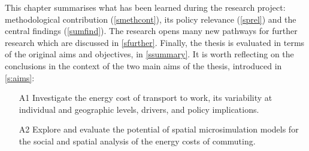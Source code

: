 \documentclass[a4paper, 11pt, twoside]{Thesis}
\begin{document}
This chapter summarises what has
been learned during the research project:
methodological  contribution (\cref{smethcont}), its policy relevance
(\cref{sprel}) and the central findings (\cref{sumfind}). The research opens many
new pathways for further research which are discussed in \cref{sfurther}.
Finally, the thesis is evaluated in terms of the original aims and objectives,
in \cref{ssummary}. It is worth reflecting on the conclusions in the
context of the two
main aims of the thesis, introduced in \cref{s:aims}:
\begin{itemize}
 \item[A1] Investigate the energy cost of transport to work, its variability
at individual and geographic levels, drivers, and policy implications.
  \item[A2] Explore and evaluate the potential of spatial microsimulation
models for the social and spatial analysis of the energy costs of commuting.
\end{itemize}
\end{document}
